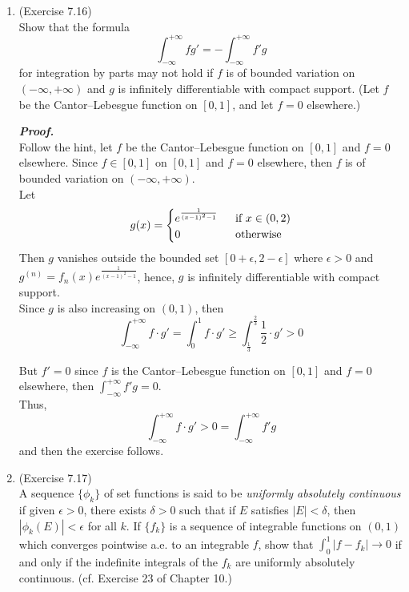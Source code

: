 \documentclass[a4paper,11pt]{article}
\begin{document}
\begin{enumerate}
  	\item (Exercise 7.16)\\
  		Show that the formula
  		$$\int_{-\infty}^{+\infty} f g' = - \int_{-\infty}^{+\infty} f' g$$
  		for integration by parts may not hold if $f$ is of bounded variation on $(-\infty, + \infty)$ and $g$ is infinitely differentiable with compact support. (Let $f$ be the Cantor–Lebesgue function on $[0,1]$, and let $f = 0$ elsewhere.)

 		\textit{\textbf {Proof.}}\\
 		Follow the hint, let $f$ be the Cantor–Lebesgue function on $[0,1]$ and $f = 0$ elsewhere. Since $f \in [0,1]$ on $[0,1]$ and $f = 0$ elsewhere, then $f$ is of bounded variation on $(-\infty, +\infty)$.\\
 		Let
 		$$g(x) =
 		\begin{cases}
 		e^{\frac{1}{(x-1)^2 - 1}} \hspace{0.2cm} &\mbox{if $x \in (0,2)$}\\
 		0 &\mbox{otherwise}
 		\end{cases}$$
 		Then $g$ vanishes outside the bounded set $[0+\epsilon, 2 - \epsilon]$ where $\epsilon > 0$ and $g^{(n)} = f_n (x) e^{\frac{1}{(x-1)^2 - 1}}$, hence, $g$ is infinitely differentiable with compact support.\\
 		Since $g$ is also increasing on $(0,1)$, then
 		$$\int_{-\infty}^{+\infty} f \cdot g'
 		= \int_0^1 f \cdot g'
 		\geq \int_{\frac{1}{3}}^{\frac{2}{3}} \frac{1}{2} \cdot g'> 0$$

 		But $f' = 0$ since $f$ is the Cantor–Lebesgue function on $[0,1]$ and $f = 0$ elsewhere, then $\int_{-\infty}^{+\infty} f' g = 0$.\\
 		Thus,
 		$$\int_{-\infty}^{+\infty} f \cdot g' > 0 = \int_{-\infty}^{+\infty} f' g$$
 		and then the exercise follows.\\








  	\item (Exercise 7.17)\\
  		A sequence $\{\phi_k\}$ of set functions is said to be \textit{uniformly absolutely continuous} if given $\epsilon > 0$, there exists $\delta > 0$ such that if $E$ satisfies $|E|<\delta$, then $|\phi_k(E)| < \epsilon$ for all $k$. If $\{f_k\}$ is a sequence of integrable functions on $(0,1)$ which converges pointwise a.e. to an integrable $f$, show that $\int_0^1 |f - f_k| \to 0$ if and only if the indefinite integrals of the $f_k$ are uniformly absolutely continuous. (cf. Exercise 23 of Chapter 10.)


\end{enumerate}
\end{document}
